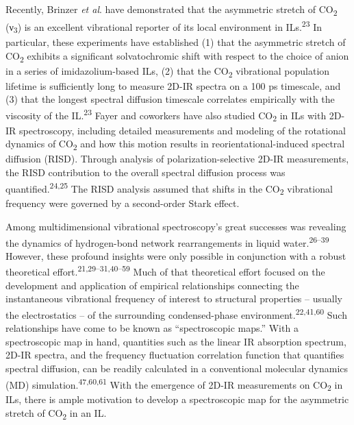 \documentclass[]{article}
\begin{document}
Recently, Brinzer \emph{et al}. have demonstrated that the asymmetric stretch of CO\textsubscript{2} (ν\textsubscript{3}) is an excellent vibrational reporter of its local environment in ILs.\textsuperscript{23} In particular, these experiments have established (1) that the asymmetric stretch of CO\textsubscript{2} exhibits a significant solvatochromic shift with respect to the choice of anion in a series of imidazolium-based ILs, (2) that the CO\textsubscript{2} vibrational population lifetime is sufficiently long to measure 2D-IR spectra on a 100 ps timescale, and (3) that the longest spectral diffusion timescale correlates empirically with the viscosity of the IL.\textsuperscript{23} Fayer and coworkers have also studied CO\textsubscript{2} in ILs with 2D-IR spectroscopy, including detailed measurements and modeling of the rotational dynamics of CO\textsubscript{2} and how this motion results in reorientational-induced spectral diffusion (RISD). Through analysis of polarization-selective 2D-IR measurements, the RISD contribution to the overall spectral diffusion process was quantified.\textsuperscript{24,25} The RISD analysis assumed that shifts in the CO\textsubscript{2} vibrational frequency were governed by a second-order Stark effect.

Among multidimensional vibrational spectroscopy's great successes was revealing the dynamics of hydrogen-bond network rearrangements in liquid water.\textsuperscript{26--39} However, these profound insights were only possible in conjunction with a robust theoretical effort.\textsuperscript{21,29--31,40--59} Much of that theoretical effort focused on the development and application of empirical relationships connecting the instantaneous vibrational frequency of interest to structural properties -- usually the electrostatics -- of the surrounding condensed-phase environment.\textsuperscript{22,41,60} Such relationships have come to be known as ``spectroscopic maps.'' With a spectroscopic map in hand, quantities such as the linear IR absorption spectrum, 2D-IR spectra, and the frequency fluctuation correlation function that quantifies spectral diffusion, can be readily calculated in a conventional molecular dynamics (MD) simulation.\textsuperscript{47,60,61} With the emergence of 2D-IR measurements on CO\textsubscript{2} in ILs, there is ample motivation to develop a spectroscopic map for the asymmetric stretch of CO\textsubscript{2} in an IL.
\end{document}

